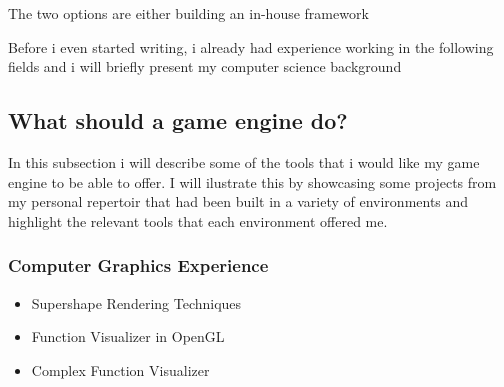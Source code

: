         The two options are either building an in-house framework 

        Before i even started writing, i already had experience working in the following fields and i will briefly present my computer science background



        \subsection{What should a game engine do?}
            In this subsection i will describe some of the tools that i would like my game engine to be able to offer.
            I will ilustrate this by showcasing some projects from my personal repertoir that had been built in a variety of environments and highlight the relevant tools that each environment offered me.

            \subsubsection{Computer Graphics Experience}
                \begin{itemize} 
                    \item Supershape Rendering Techniques 
                    \item Function Visualizer in OpenGL 
                    \item Complex Function Visualizer 
                \end{itemize}


